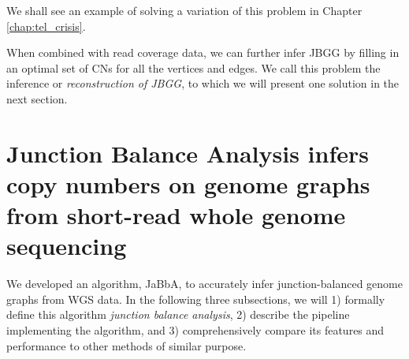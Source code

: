 \documentclass[phd,tocprelim]{cornell}
\begin{document}
We shall see an example of solving a variation of this problem in Chapter \ref{chap:tel_crisis}.

When combined with read coverage data, we can further infer JBGG by filling in an optimal set of CNs for all the vertices and edges. We call this problem the inference or \textit{reconstruction of JBGG}, to which we will present one solution in the next section.



\clearpage
\section{Junction Balance Analysis infers copy numbers on genome graphs from short-read whole genome sequencing}

We developed an algorithm, JaBbA, to accurately infer junction-balanced genome graphs from WGS data. In the following three subsections, we will 1) formally define this algorithm \textit{junction balance analysis}, 2) describe the pipeline implementing the algorithm, and 3) comprehensively compare its features and performance to other methods of similar purpose.
\end{document}
